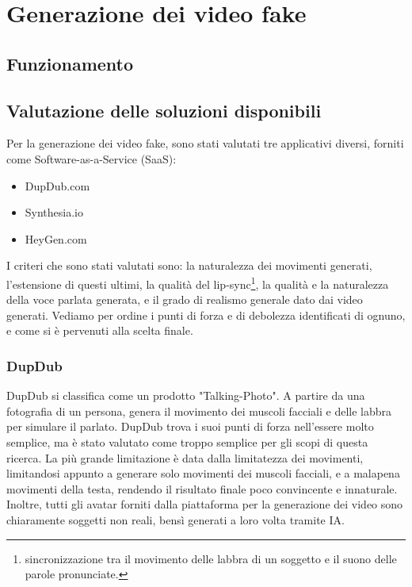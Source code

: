 \chapter{Generazione dei video fake}

\section{Funzionamento}

\section{Valutazione delle soluzioni disponibili}

Per la generazione dei video fake, sono stati valutati tre applicativi diversi, forniti come Software-as-a-Service (SaaS):
\begin{itemize}
    \item DupDub.com
    \item Synthesia.io
    \item HeyGen.com
\end{itemize}

I criteri che sono stati valutati sono: la naturalezza dei movimenti generati, l'estensione di questi ultimi, la qualità del lip-sync\footnote{sincronizzazione tra il movimento delle labbra di un soggetto e il suono delle parole pronunciate.}, la qualità e la naturalezza della voce parlata generata, e il grado di realismo generale dato dai video generati. Vediamo per ordine i punti di forza e di debolezza identificati di ognuno, e come si è pervenuti alla scelta finale. 

\subsection{DupDub}

DupDub si classifica come un prodotto "Talking-Photo". A partire da una fotografia di un persona, genera il movimento dei muscoli facciali e delle labbra per simulare il parlato. DupDub trova i suoi punti di forza nell'essere molto semplice, ma è stato valutato come troppo semplice per gli scopi di questa ricerca. La più grande limitazione è data dalla limitatezza dei movimenti, limitandosi appunto a generare solo movimenti dei muscoli facciali, e a malapena movimenti della testa, rendendo il risultato finale poco convincente e innaturale. Inoltre, tutti gli avatar forniti dalla piattaforma per la generazione dei video sono chiaramente soggetti non reali, bensì generati a loro volta tramite IA.

